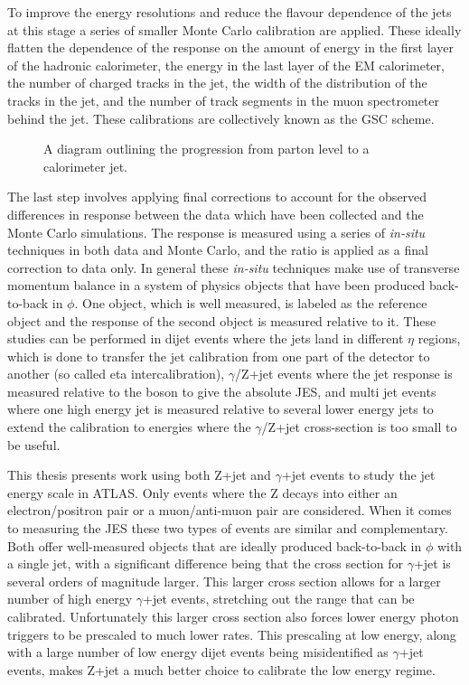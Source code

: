 To improve the energy resolutions and reduce the flavour dependence of the jets at this stage a series of smaller Monte Carlo calibration are applied.  
These ideally flatten the dependence of the response on the amount of energy in the first layer of the hadronic calorimeter, the energy in the last layer of the EM calorimeter, the number of charged tracks in the jet, the width of the distribution of the tracks in the jet, and the number of track segments in the muon spectrometer behind the jet.  
These calibrations are collectively known as the \gls{GSC} scheme.  

\begin{figure}[!ht]
  \begin{center}
  \end{center}
  \caption[Jet calibration sequence used by ATLAS.]
      {\small A diagram outlining the progression from parton level to a calorimeter jet.}
  \label{Fig:JetCalibSequenceFig}
\end{figure}


The last step involves applying final corrections to account for the observed differences in response between the data which have been collected and the Monte Carlo simulations.  
The response is measured using a series of \textit{in-situ} techniques in both data and Monte Carlo, and the ratio is applied as a final correction to data only.  
In general these \textit{in-situ} techniques make use of transverse momentum balance in a system of physics objects that have been produced back-to-back in $\phi$.  
One object, which is well measured, is labeled as the reference object and the response of the second object is measured relative to it.  
These studies can be performed in dijet events where the jets land in different $\eta$ regions, which is done to transfer the jet calibration from one part of the detector to another (so called eta intercalibration), $\gamma$/Z+jet events where the jet response is measured relative to the boson to give the absolute JES, and multi jet events where one high energy jet is measured relative to several lower energy jets to extend the calibration to energies where the $\gamma$/Z+jet cross-section is too small to be useful.  

This thesis presents work using both Z+jet and $\gamma$+jet events to study the jet energy scale in ATLAS.  
Only events where the Z decays into either an electron/positron pair or a muon/anti-muon pair are considered.  
When it comes to measuring the JES these two types of events are similar and complementary.  
Both offer well-measured objects that are ideally produced back-to-back in $\phi$ with a single jet, with a significant difference being that the cross section for $\gamma$+jet is several orders of magnitude larger.   
This larger cross section allows for a larger number of high energy $\gamma$+jet events, stretching out the range that can be calibrated.  
Unfortunately this larger cross section also forces lower energy photon triggers to be prescaled to much lower rates.  
This prescaling at low energy, along with a large number of low energy dijet events being misidentified as $\gamma$+jet events, makes Z+jet a much better choice to calibrate the low energy regime.  

